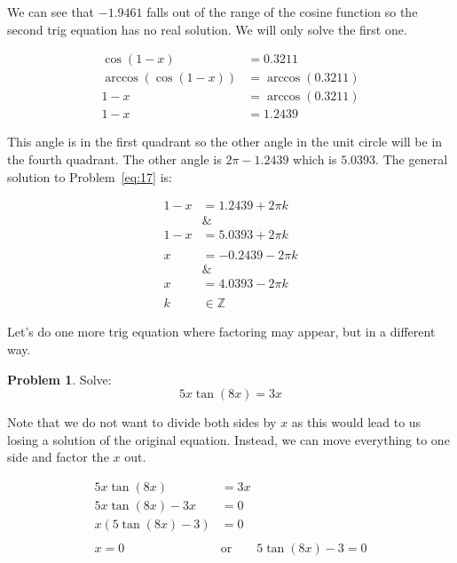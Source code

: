 \documentclass[12pt]{article}
\theoremstyle{definition}
\newtheorem{problem}{Problem}
\begin{document}
We can see that $-1.9461$ falls out of the range of the cosine function so the second trig equation has no real solution.
We will only solve the first one.

\begin{align}
    \cos(1-x)          & = 0.3211          \\
    \arccos(\cos(1-x)) & = \arccos(0.3211) \\
    1-x                & = \arccos(0.3211) \\
    1-x                & = 1.2439
\end{align}

This angle is in the first quadrant so the other angle in the unit circle will be in the fourth quadrant.
The other angle is $2\pi - 1.2439$ which is $5.0393$.
The general solution to Problem~\eqref{eq:17} is:

\begin{align}
    1-x       & = 1.2439 + 2\pi k  \\
    \nonumber & \&                 \\
    1-x       & = 5.0393 + 2\pi k  \\
    \nonumber                      \\
    x         & = -0.2439 - 2\pi k \\
    \nonumber & \&                 \\
    x         & = 4.0393 - 2\pi k  \\
    \nonumber                      \\
    k         & \in \mathbb{Z}
\end{align}

Let's do one more trig equation where factoring may appear, but in a different way.

\begin{problem}
Solve:
\begin{equation*}
    5x\tan(8x) = 3x \label{eq:18}
\end{equation*}
\end{problem}

Note that we do not want to divide both sides by $x$ as this would lead to us losing a solution of the original equation.
Instead, we can move everything to one side and factor the $x$ out.

\begin{align}
    5x\tan(8x)       & = 3x                             \\
    5x\tan(8x) - 3x  & = 0                              \\
    x(5\tan(8x) - 3) & = 0                              \\
    \nonumber                                           \\
    x = 0 \qquad     & \text{or} \qquad 5\tan(8x)-3 = 0
\end{align}
\end{document}
